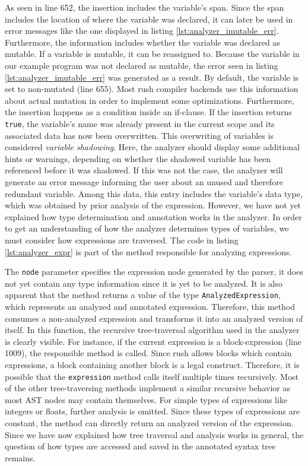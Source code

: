 As seen in line 652, the insertion includes the variable's span.
Since the span includes the location of where the variable was declared,
it can later be used in error messages like the one displayed in listing \ref{lst:analyzer_imutable_err}.
Furthermore, the information includes whether the variable was declared as mutable.
If a variable is mutable, it can be reassigned to.
Because the variable in our example program was not declared as mutable,
the error seen in listing \ref{lst:analyzer_imutable_err} was generated as a result.
By default, the variable is set to non-mutated (line 655).
Most rush compiler backends use this information about actual mutation in order to implement some optimizations.
Furthermore, the insertion happens as a condition inside an if-clause.
If the insertion returns \texttt{true}, the variable's name was already present in the current scope and its associated data has now been overwritten.
This overwriting of variables is considered \emph{variable shadowing}.
Here, the analyzer should display some additional hints or warnings, depending on whether the shadowed variable has been referenced before it was shadowed.
If this was not the case, the analyzer will generate an error message informing the user about an unused and therefore redundant variable.
Among this data, this entry includes the variable's data type, which was obtained by prior analysis of the expression.
However, we have not yet explained how type determination and annotation works in the analyzer.
In order to get an understanding of how the analyzer determines types of variables, we must consider how expressions are traversed.
The code in listing \ref{lst:analyzer_expr} is part of the method responsible for analyzing expressions.


The \texttt{node} parameter specifies the expression node generated by the parser,
it does not yet contain any type information since it is yet to be analyzed.
It is also apparent that the method returns a value of the type \texttt{AnalyzedExpression},
which represents an analyzed and annotated expression.
Therefore, this method consumes a non-analyzed expression and transforms it into an analyzed version of itself.
In this function, the recursive tree-traversal algorithm used in the analyzer is clearly visible.
For instance, if the current expression is a block-expression (line 1009), the responsible method is called.
Since rush allows blocks which contain expressions, a block containing another block is a legal construct.
Therefore, it is possible that the \texttt{expression} method calls itself multiple times recursively.
Most of the other tree-traversing methods implement a similar recursive behavior as most AST nodes may contain themselves.
For simple types of expressions like integers or floats, further analysis is omitted.
Since these types of expressions are constant, the method can directly return an analyzed version of the expression.
Since we have now explained how tree traversal and analysis works in general, the question of how types are accessed and saved in the annotated syntax tree remains.


